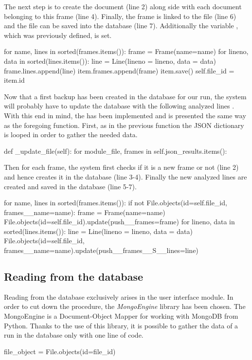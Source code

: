 The next step is to create the  document (line 2) along side with each  document belonging to this frame (line 4). Finally, the frame is linked to the file (line 6) and the file can be saved into the database (line 7). Additionally the variable , which was previously defined, is set.
\begin{python}
for name, lines in sorted(frames.items()):
    frame = Frame(name=name)
    for lineno, data in sorted(lines.items()):
        line = Line(lineno = lineno, data = data)
        frame.lines.append(line)
    item.frames.append(frame)
    item.save()
self.file_id = item.id
\end{python}

Now that a first backup has been created in the database for our run, the system will probably have to update the database with the following analyzed lines . With this end in mind, the  has been implemented and is presented the same way as the foregoing function. First, as in the previous function the JSON dictionary is looped in order to gather the needed data.
\begin{python}
def _update_file(self):
  for module_file, frames in self.json_results.items():
\end{python}

Then for each frame, the system first checks if it is a new frame or not (line 2) and hence creates it in the database (line 3-4). Finally the new analyzed lines are created and saved in the database (line 5-7).
\begin{python}
for name, lines in sorted(frames.items()):
    if not File.objects(id=self.file_id, frames__name=name):
        frame = Frame(name=name)
        File.objects(id=self.file_id).update(push__frames=frame)
    for lineno, data in sorted(lines.items()):
        line = Line(lineno = lineno, data = data)
        File.objects(id=self.file_id, frames__name=name).update(push__frames__S__lines=line)
\end{python}

\subsection{Reading from the database}

Reading from the database exclusively arises in the user interface module. In order to cut down the procedure, the \textit{MongoEngine} library has been chosen. The MongoEngine is a Document-Object Mapper for working with MongoDB from Python. Thanks to the use of this library, it is possible to gather the data of a run in the database only with one line of code.
\begin{python}
file_object = File.objects(id=file_id)
\end{python} 

